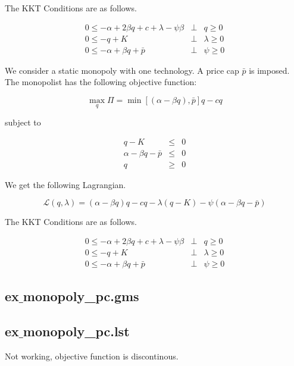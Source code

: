 \documentclass[11pt,a4paper]{article}
\begin{document}
The KKT Conditions are as follows.

\begin{eqnarray*}
	0 \leq -\alpha + 2\beta q + c + \lambda - \psi\beta &\bot& q \geq 0\\
	0 \leq -q + K &\bot& \lambda \geq 0\\
        0 \leq - \alpha + \beta q + \bar{p}  &\bot& \psi \geq 0
\end{eqnarray*}

We consider a static monopoly with one technology. A price cap $\bar{p}$ is imposed. The monopolist has the following objective function:

\begin{equation*}
	\max_q\Pi = \min\left[(\alpha-\beta q),\bar{p}\right]q - cq 
\end{equation*}

subject to

\begin{eqnarray*}
	q - K &\leq& 0\\
        \alpha-\beta q - \bar{p} &\leq& 0 \\ 
	q &\geq& 0 
\end{eqnarray*}
 
We get the following Lagrangian.

\begin{equation*}
	\mathcal{L}(q,\lambda)= (\alpha-\beta q)q - cq -\lambda(q-K) - \psi\left(\alpha-\beta q-\bar{p}\right)
\end{equation*}

The KKT Conditions are as follows.

\begin{eqnarray*}
	0 \leq -\alpha + 2\beta q + c + \lambda - \psi\beta &\bot& q \geq 0\\
	0 \leq -q + K &\bot& \lambda \geq 0\\
        0 \leq - \alpha + \beta q + \bar{p}  &\bot& \psi \geq 0
\end{eqnarray*}

\subsection*{ex$\_$monopoly\_pc.gms}


\subsection*{ex$\_$monopoly\_pc.lst}


Not working, objective function is discontinous.
\end{document}
